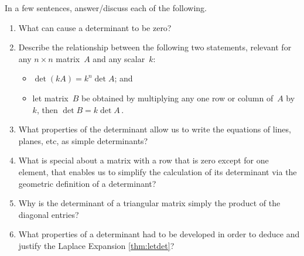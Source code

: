 \begin{exercise} 
In a few sentences, answer\slash discuss each of the following.
\begin{enumerate}
\item What can cause a determinant to be zero?

\item Describe the relationship between the following two statements, relevant for any \(n\times n\) matrix~\(A\) and any scalar~\(k\):  \begin{itemize}
\item \(\det(kA)=k^n\det A\); and 
\item let matrix~\(B\) be obtained by multiplying any {one} row or column of~\(A\) by~\(k\), then \(\det B=k\det A\)\,.
\end{itemize}


\item What properties of the determinant allow us to write the equations of lines, planes, etc, as simple determinants?

\item What is special about a matrix with a row that is zero except for one element, that enables us to simplify the calculation of its determinant via the geometric definition of a determinant?

\item Why is the determinant of a triangular matrix simply the product of the diagonal entries?

\item What properties of a determinant had to be developed in order to deduce and justify the Laplace Expansion \cref{thm:letdet}?

\end{enumerate}
\end{exercise}


\begin{comment}%
why, what caused X?
how did X occur?
what-if? what-if-not?
how does X compare with Y?
what is the evidence for X?
why is X important?
\end{comment}


